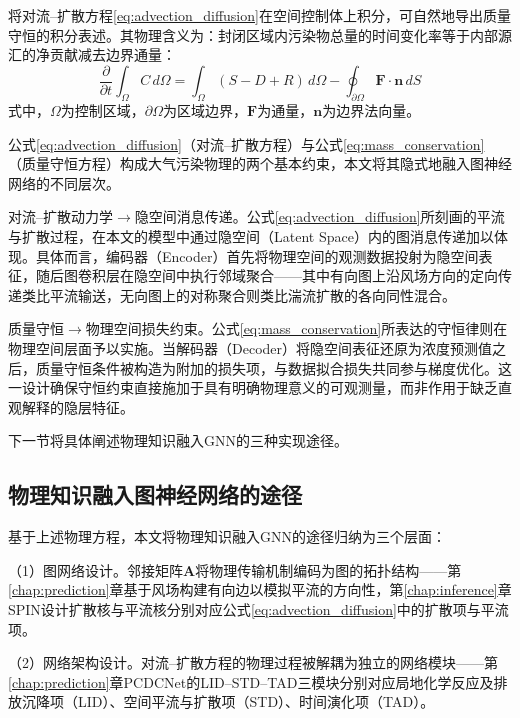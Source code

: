 将对流--扩散方程\eqref{eq:advection_diffusion}在空间控制体上积分，可自然地导出质量守恒的积分表述。其物理含义为：封闭区域内污染物总量的时间变化率等于内部源汇的净贡献减去边界通量：
\begin{equation}
\frac{\partial}{\partial t} \int_{\Omega} C \, d\Omega = \int_{\Omega} (S - D + R) \, d\Omega - \oint_{\partial\Omega} \mathbf{F} \cdot \mathbf{n} \, dS
\label{eq:mass_conservation}
\end{equation}
\noindent 式中，$\Omega$为控制区域，$\partial\Omega$为区域边界，$\mathbf{F}$为通量，$\mathbf{n}$为边界法向量。

公式\eqref{eq:advection_diffusion}（对流--扩散方程）与公式\eqref{eq:mass_conservation}（质量守恒方程）构成大气污染物理的两个基本约束，本文将其隐式地融入图神经网络的不同层次。

对流--扩散动力学$\rightarrow$隐空间消息传递。公式\eqref{eq:advection_diffusion}所刻画的平流与扩散过程，在本文的模型中通过隐空间（Latent Space）内的图消息传递加以体现。具体而言，编码器（Encoder）首先将物理空间的观测数据投射为隐空间表征，随后图卷积层在隐空间中执行邻域聚合——其中有向图上沿风场方向的定向传递类比平流输送，无向图上的对称聚合则类比湍流扩散的各向同性混合。

质量守恒$\rightarrow$物理空间损失约束。公式\eqref{eq:mass_conservation}所表达的守恒律则在物理空间层面予以实施。当解码器（Decoder）将隐空间表征还原为浓度预测值之后，质量守恒条件被构造为附加的损失项，与数据拟合损失共同参与梯度优化。这一设计确保守恒约束直接施加于具有明确物理意义的可观测量，而非作用于缺乏直观解释的隐层特征。

下一节将具体阐述物理知识融入GNN的三种实现途径。

\subsection{物理知识融入图神经网络的途径}
\label{subsec:physics_guidance}

基于上述物理方程，本文将物理知识融入GNN的途径归纳为三个层面：

（1）图网络设计。邻接矩阵$\mathbf{A}$将物理传输机制编码为图的拓扑结构——第\ref{chap:prediction}章\ModelPred 基于风场构建有向边以模拟平流的方向性，第\ref{chap:inference}章SPIN设计扩散核与平流核分别对应公式\eqref{eq:advection_diffusion}中的扩散项与平流项。

（2）网络架构设计。对流--扩散方程的物理过程被解耦为独立的网络模块——第\ref{chap:prediction}章PCDCNet的LID--STD--TAD三模块分别对应局地化学反应及排放沉降项（LID）、空间平流与扩散项（STD）、时间演化项（TAD）。

